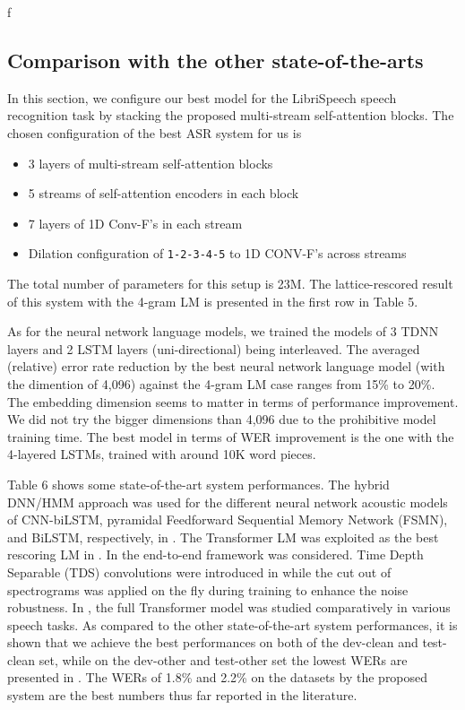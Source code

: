 f\documentclass{article}
\begin{document}
\subsection{Comparison with the other state-of-the-arts}
In this section, we configure our best model for the LibriSpeech speech recognition task by stacking the proposed multi-stream self-attention blocks. The chosen configuration of the best ASR system for us is
\begin{itemize}
    \item 3 layers of multi-stream self-attention blocks
    \item 5 streams of self-attention encoders in each block
    \item 7 layers of 1D Conv-F's in each stream
    \item Dilation configuration of \texttt{1-2-3-4-5} to 1D CONV-F's across streams 
\end{itemize}
The total number of parameters for this setup is 23M. The lattice-rescored result of this system with the 4-gram LM is presented in the first row in Table 5.

As for the neural network language models, we trained the models of 3 TDNN layers and 2 LSTM layers (uni-directional) being interleaved. The averaged (relative) error rate reduction by the best neural network language model (with the dimention of 4,096) against the 4-gram LM case ranges from 15\% to 20\%. The embedding dimension seems to matter in terms of performance improvement. We did not try the bigger dimensions than 4,096 due to the prohibitive model training time. The best model in terms of WER improvement is the one with the 4-layered LSTMs, trained with around 10K word pieces. 

Table 6 shows some state-of-the-art system performances. The hybrid DNN/HMM approach was used for the different neural network acoustic models of CNN-biLSTM, pyramidal Feedforward Sequential Memory Network (FSMN), and BiLSTM, respectively, in \cite{capio,cloudwalk,rwth}. The Transformer LM was exploited as the best rescoring LM in \cite{rwth}. In \cite{tds,specaugment} the end-to-end framework was considered. Time Depth Separable (TDS) convolutions were introduced in \cite{tds} while the cut out of spectrograms was applied on the fly during training to enhance the noise robustness. In \cite{karita}, the full Transformer model was studied comparatively in various speech tasks. As compared to the other state-of-the-art system performances, it is shown that we achieve the best performances on both of the dev-clean and test-clean set, while on the dev-other and test-other set the lowest WERs are presented in \cite{rwth}. The WERs of 1.8\% and 2.2\% on the datasets by the proposed system are the best numbers thus far reported in the literature.
\end{document}

